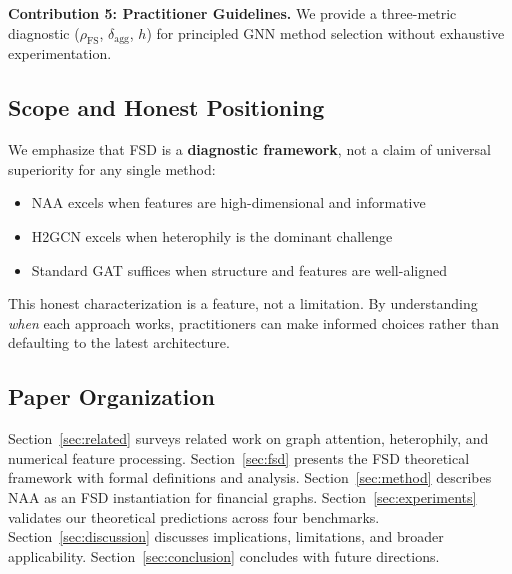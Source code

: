 \textbf{Contribution 5: Practitioner Guidelines.} We provide a three-metric diagnostic ($\rho_{\text{FS}}$, $\delta_{\text{agg}}$, $h$) for principled GNN method selection without exhaustive experimentation.

\subsection{Scope and Honest Positioning}

We emphasize that FSD is a \textbf{diagnostic framework}, not a claim of universal superiority for any single method:
\begin{itemize}
    \item NAA excels when features are high-dimensional and informative
    \item H2GCN excels when heterophily is the dominant challenge
    \item Standard GAT suffices when structure and features are well-aligned
\end{itemize}

This honest characterization is a feature, not a limitation. By understanding \textit{when} each approach works, practitioners can make informed choices rather than defaulting to the latest architecture.

\subsection{Paper Organization}

Section~\ref{sec:related} surveys related work on graph attention, heterophily, and numerical feature processing. Section~\ref{sec:fsd} presents the FSD theoretical framework with formal definitions and analysis. Section~\ref{sec:method} describes NAA as an FSD instantiation for financial graphs. Section~\ref{sec:experiments} validates our theoretical predictions across four benchmarks. Section~\ref{sec:discussion} discusses implications, limitations, and broader applicability. Section~\ref{sec:conclusion} concludes with future directions.
